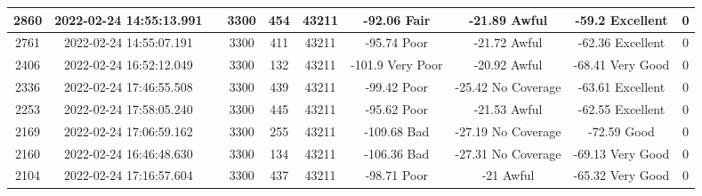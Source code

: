 \begin{longtable*}{|c|c|c|c|c|c|c|c|c|c|}
2860&2022-02-24 14:55:13.991&&3300&454&43211& -92.06    Fair        & -21.89    Awful       & -59.2     Excellent   & 0\\\hline
{}2761&2022-02-24 14:55:07.191&&3300&411&43211& -95.74    Poor        & -21.72    Awful       & -62.36    Excellent   & 0\\\hline
{}2406&2022-02-24 16:52:12.049&&3300&132&43211& -101.9    Very Poor   & -20.92    Awful       & -68.41    Very Good   & 0\\\hline
{}2336&2022-02-24 17:46:55.508&&3300&439&43211& -99.42    Poor        & -25.42    No Coverage & -63.61    Excellent   & 0\\\hline
{}2253&2022-02-24 17:58:05.240&&3300&445&43211& -95.62    Poor        & -21.53    Awful       & -62.55    Excellent   & 0\\\hline
{}2169&2022-02-24 17:06:59.162&&3300&255&43211& -109.68   Bad         & -27.19    No Coverage & -72.59    Good        & 0\\\hline
{}2160&2022-02-24 16:46:48.630&&3300&134&43211& -106.36   Bad         & -27.31    No Coverage & -69.13    Very Good   & 0\\\hline
{}2104&2022-02-24 17:16:57.604&&3300&437&43211& -98.71    Poor        & -21       Awful       & -65.32    Very Good   & 0\\\hline

\end{longtable*}
